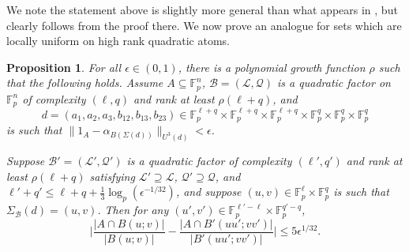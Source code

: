 \documentclass[12pt,oneside,british,a4wide]{amsart}
\newtheorem{proposition}[theorem]{Proposition}
\numberwithin{equation}{section}
\theoremstyle{definition}
\def\F{\mathbb{F}}
\def\e{\epsilon}
\newcommand{\calL}{\mathcal{L}}
\newcommand{\calB}{\mathcal{B}}
\newcommand{\calQ}{\mathcal{Q}}
\begin{document}
 We note the statement above is slightly more general than what appears in \cite{Nagle.2024}, but clearly follows from the proof there.  We now prove an analogue for sets which are locally uniform on high rank quadratic atoms.

\begin{proposition}\label{prop:preservedensity}
 For all $\e\in (0,1)$, there is a polynomial growth function $\rho$ such that the following holds.  Assume $A\subseteq \F_p^n$, $\calB=(\calL,\calQ)$ is a quadratic factor on $\F_p^n$ of complexity $(\ell, q)$ and rank at least $\rho(\ell+q)$, and 
 $$
 d=(a_1,a_2,a_3,b_{12},b_{13},b_{23})\in \F_p^{\ell+q}\times \F_p^{\ell+q}\times\F_p^{\ell+q}\times\F_p^{q}\times\F_p^{q}\times\F_p^{q}
 $$
  is such that $\|1_A-\alpha_{B(\Sigma(d))}\|_{U^3(d)}<\e$.  
 
 Suppose $\calB'=(\calL',\calQ')$ is a quadratic factor of complexity $(\ell',q')$ and rank at least $\rho(\ell+q)$  satisfying $\calL'\supseteq \calL$, $\calQ'\supseteq \calQ$, and $\ell'+q'\leq \ell+q+\frac{1}{3}\log_p(\e^{-1/32})$, and suppose $(u,v)\in \F_p^{\ell}\times \F_p^{q}$ is such that $\Sigma_{\calB}(d)=(u,v)$. Then for any $(u',v')\in \F_p^{\ell'-\ell}\times \F_p^{q'-q}$, 
 $$
 \Bigg|\frac{|A\cap B(u;v)|}{|B(u;v)|}-\frac{|A\cap  B'(uu';vv')|}{|B'(uu';vv')|}\Bigg|\leq 5\e^{1/32}.
 $$ 
\end{proposition}
\end{document}
